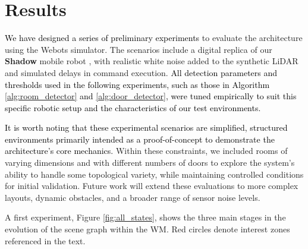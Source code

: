 \documentclass[10pt,a4paper]{article}
\begin{document}
\section{Results}


\textcolor{black}{We have designed a series of preliminary experiments} to evaluate the architecture using the Webots simulator. The scenarios include a digital replica of our \textbf{Shadow} mobile robot \cite{Torrejón2024}, with realistic white noise added to the synthetic LiDAR and simulated delays in command execution. \textcolor{black}{All detection parameters and thresholds used in the following experiments, such as those in Algorithm \ref{alg:room_detector} and  \ref{alg:door_detector}, were tuned empirically to suit this specific robotic setup and the characteristics of our test environments.} 

\textcolor{black}{It is worth noting that these experimental scenarios are simplified, structured environments primarily intended as a proof-of-concept to demonstrate the architecture's core mechanics.} Within these constraints, we included rooms of varying dimensions and with different numbers of doors to explore the system's ability to handle some topological variety, while maintaining controlled conditions for initial validation. Future work will extend these evaluations to more complex layouts, dynamic obstacles, and a broader range of sensor noise levels.

A first experiment, Figure \ref{fig:all_states}, shows the three main stages in the evolution of the scene graph within the WM. Red circles denote interest zones referenced in the text.
\end{document}
